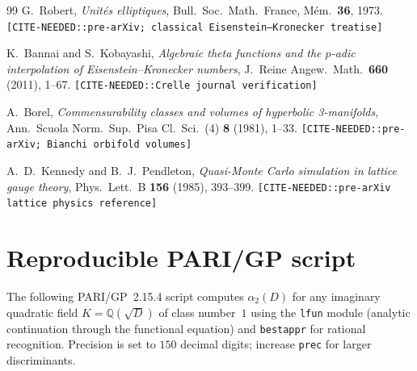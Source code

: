 \documentclass[12pt]{amsart}
\theoremstyle{definition}
\newcommand{\Q}{\mathbb{Q}}
\begin{document}
\begin{thebibliography}{99}
  G.~Robert,
  \emph{Unit\'es elliptiques}, Bull.\ Soc.\ Math.\ France, M\'em.\ \textbf{36}, 1973.
  \texttt{[CITE-NEEDED::pre-arXiv; classical Eisenstein--Kronecker treatise]}

  K.~Bannai and S.~Kobayashi,
  \emph{Algebraic theta functions and the $p$-adic interpolation of Eisenstein--Kronecker numbers},
  J.\ Reine Angew.\ Math.\ \textbf{660} (2011), 1--67.
  \texttt{[CITE-NEEDED::Crelle journal verification]}

  A.~Borel,
  \emph{Commensurability classes and volumes of hyperbolic 3-manifolds},
  Ann.\ Scuola Norm.\ Sup.\ Pisa Cl.\ Sci.\ (4) \textbf{8} (1981), 1--33.
  \texttt{[CITE-NEEDED::pre-arXiv; Bianchi orbifold volumes]}

  A.~D.~Kennedy and B.~J.~Pendleton,
  \emph{Quasi-Monte Carlo simulation in lattice gauge theory},
  Phys.\ Lett.\ B \textbf{156} (1985), 393--399.
  \texttt{[CITE-NEEDED::pre-arXiv lattice physics reference]}

\end{thebibliography}

\appendix

\section{Reproducible PARI/GP script}\label{sec:pari}

The following PARI/GP~2.15.4 script computes $\alpha_2(D)$ for any
imaginary quadratic field $K = \Q(\sqrt{D})$ of class number~$1$
using the \texttt{lfun} module (analytic continuation through the
functional equation) and \texttt{bestappr} for rational recognition.
Precision is set to $150$ decimal digits; increase \texttt{prec} for
larger discriminants.
\end{document}
